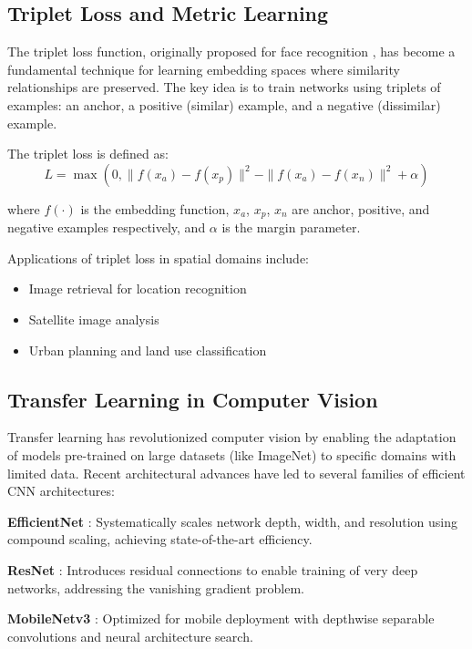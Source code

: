 \subsection{Triplet Loss and Metric Learning}

The triplet loss function, originally proposed for face recognition \cite{schroff2015facenet}, has become a fundamental technique for learning embedding spaces where similarity relationships are preserved. The key idea is to train networks using triplets of examples: an anchor, a positive (similar) example, and a negative (dissimilar) example.

The triplet loss is defined as:
\begin{equation}
L = \max(0, \|f(x_a) - f(x_p)\|^2 - \|f(x_a) - f(x_n)\|^2 + \alpha)
\end{equation}

where $f(\cdot)$ is the embedding function, $x_a$, $x_p$, $x_n$ are anchor, positive, and negative examples respectively, and $\alpha$ is the margin parameter.

Applications of triplet loss in spatial domains include:
\begin{itemize}
    \item Image retrieval for location recognition \cite{arandjelovic2016netvlad}
    \item Satellite image analysis \cite{hu2018deep}
    \item Urban planning and land use classification \cite{jean2016combining}
\end{itemize}

\subsection{Transfer Learning in Computer Vision}

Transfer learning has revolutionized computer vision by enabling the adaptation of models pre-trained on large datasets (like ImageNet) to specific domains with limited data. Recent architectural advances have led to several families of efficient CNN architectures:

\textbf{EfficientNet} \cite{tan2019efficientnet}: Systematically scales network depth, width, and resolution using compound scaling, achieving state-of-the-art efficiency.

\textbf{ResNet} \cite{he2016resnet}: Introduces residual connections to enable training of very deep networks, addressing the vanishing gradient problem.

\textbf{MobileNetv3} \cite{howard2019mobilenetv3}: Optimized for mobile deployment with depthwise separable convolutions and neural architecture search.

